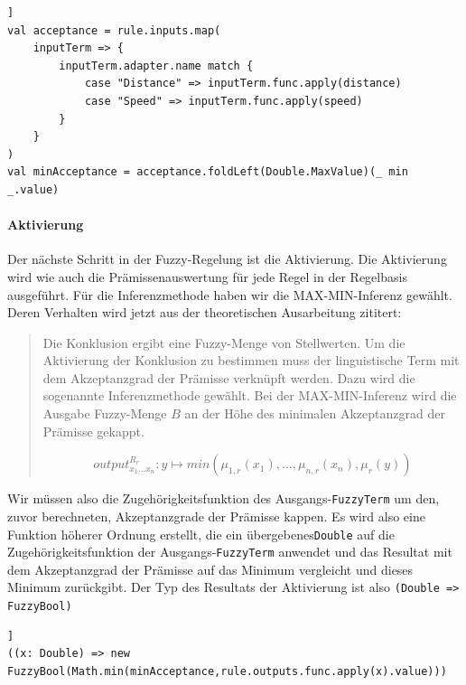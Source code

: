 \documentclass[12pt,a4paper,bibliography=totocnumbered,listof=totocnumbered, abstracton]{scrartcl}
\def\code#1{\texttt{#1}}
\theoremstyle{Umgebung}
\begin{document}
\begin{lstlisting}[firstnumber=1, style=myScalastyle, caption=Berechnung des Akzeptanzgrad, label=lst:acceptance]]
val acceptance = rule.inputs.map(
	inputTerm => {
		inputTerm.adapter.name match {
			case "Distance" => inputTerm.func.apply(distance)
			case "Speed" => inputTerm.func.apply(speed)
		}
	}
)
val minAcceptance = acceptance.foldLeft(Double.MaxValue)(_ min _.value)
\end{lstlisting}

\paragraph{Aktivierung}

Der nächste Schritt in der Fuzzy-Regelung ist die Aktivierung. Die Aktivierung wird wie auch die Prämissenauswertung für jede Regel in der Regelbasis ausgeführt. Für die Inferenzmethode haben wir die MAX-MIN-Inferenz gewählt. Deren Verhalten wird jetzt aus der theoretischen Ausarbeitung zititert:

\begin{quote}Die Konklusion ergibt eine Fuzzy-Menge von Stellwerten. Um die Aktivierung der Konklusion zu bestimmen muss der linguistische Term mit dem Akzeptanzgrad der Prämisse verknüpft werden. Dazu wird die sogenannte Inferenzmethode gewählt. Bei der MAX-MIN-Inferenz wird die Ausgabe Fuzzy-Menge $B$ an der Höhe des minimalen Akzeptanzgrad der Prämisse gekappt. 
	
	\begin{equation}
	output^{R_r}_{x_1...x_n}:  y \mapsto min(\mu_{1,r}(x_1), ..., \mu_{n,r}(x_n), \mu_r(y))
	\end{equation}
\end{quote}

Wir müssen also die Zugehörigkeitsfunktion des Ausgangs-\code{FuzzyTerm} um den, zuvor berechneten, Akzeptanzgrade der Prämisse kappen. Es wird also eine Funktion höherer Ordnung erstellt, die ein übergebenes\code{Double} auf die Zugehörigkeitsfunktion der Ausgangs-\code{FuzzyTerm} anwendet und das Resultat mit dem Akzeptanzgrad der Prämisse auf das Minimum vergleicht und dieses Minimum zurückgibt. Der Typ des Resultats der Aktivierung ist also \code{(Double => FuzzyBool)}

\begin{lstlisting}[firstnumber=1, style=myScalastyle, caption=Berechnung der Aktivierung, label=lst:activation]]
((x: Double) => new FuzzyBool(Math.min(minAcceptance,rule.outputs.func.apply(x).value)))
\end{lstlisting}
\end{document}
